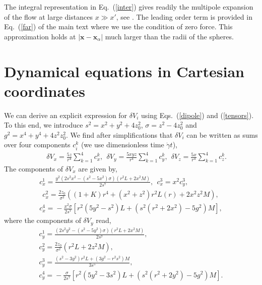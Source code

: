 The integral representation in Eq.~(\ref{inter}) gives readily the multipole expansion of the flow at large distances $x\gg x'$, see \cite{ps,kim_karrila}. The leading order term is provided in Eq.~(\ref{far}) of the main text
where we use the condition of zero force. This approximation holds at $|\bm x-\bm x_{\alpha}|$ much larger than the radii of the spheres.


\section{Dynamical equations in Cartesian coordinates}
\label{cartesian}

We can derive an explicit expression for $\delta V_i$ using Eqs.~(\ref{dipole}) and (\ref{tensors}). To this end, we introduce $s^2 = x^2+y^2+4z_0^2$,
$\sigma=z^2-4z_0^2$ and $g^2=x^4+y^4+4z^2 z_0^2$. We find after simplifications that $\delta V_i$ can be written as sums over four components $c_i^k$ (we use dimensionless time $\dot{\gamma} t$),
\begin{eqnarray}&&\!\!\!\!\!\!\!\!\!\!\!
\delta V_x\!=\! \frac{5z}{r^4}\!\sum_{k=1}^4\! c_x^k,
\ \
\delta V_y\! = \!\frac{5xyz}{r^4}\! \sum_{k=1}^4 \!c_y^k,
\ \
\delta V_z\! =\! \frac{5x}{r^4}\!\sum_{k=1}^4\! c_z^k.
\label{delV}
\end{eqnarray}
The components of $\delta V_x$ are given by,
\begin{equation} \begin{aligned}  %
c_{x}^1\!  =\!
\frac{y^2(2s^2x^2\!-\!(s^2\!-\!5x^2)\sigma)(r^2L\!+\!2x^2M)}{2 s^7},\ \ c_{x}^3\! =\!x^2 c_{y}^3 ,\\
\ \ c_{x}^2\! =\!
\frac{2z_0}{\sigma^2}((1\!+\!K)r^4\!+\!(x^2\!+\!z^2)r^2L(r)\!+\!2x^2z^2M), \\ %
c_{x}^4 \!=\!-\frac{x^2\sigma}{2s^7}[r^2(5y^2\!-\!s^2)L\!+\!
  (s^2(r^2\!+\!2x^2)\!-\!5g^2)M],
\end{aligned}
\end{equation}
where the components of $\delta V_y$ read,
\begin{equation} \begin{aligned} %
c_{y}^1 \!=\!
\frac{(2s^2y^2\!-\!(s^2\!-\!5y^2)\sigma)(r^2L\!+\!2x^2M)}{2s^7},\\
c_{y}^2 \!=\! \frac{2z_0}{\sigma^2}(r^2L\!+\!2z^2M),\\
c_{y}^3 \!=\! \frac{(s^2\!-\!3y^2)r^2L\!+\!(3g^2\!-\!r^2s^2)M}{3s^5}, \\
c_{y}^4\! =\!
-\frac{\sigma}{2s^7}[r^2(5y^2\!-\!3s^2)L\!+\!
(s^2(r^2+2y^2)\!-\!5g^2)M].
\end{aligned}\end{equation}
